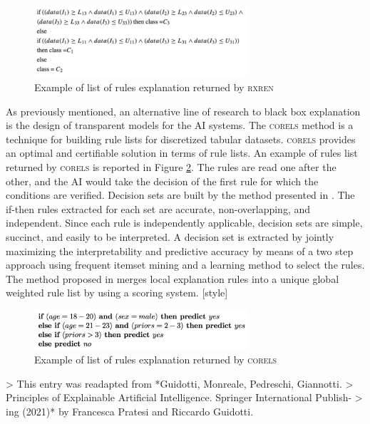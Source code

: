 \begin{figure}[!htb]
    \centering
    \includegraphics[width=300px]{TAILOR_T31_rules1.png}
    \caption{Example of list of rules explanation returned by \textsc{rxren}}
    \label{fig:rules_rxren}
\end{figure}


As previously mentioned, an alternative line of research to black box explanation
is the design of transparent models for the AI systems. The \textsc{corels} method \cite{angelino5} is
a technique for building rule lists for discretized tabular datasets. \textsc{corels} provides
an optimal and certifiable solution in terms of rule lists. An example of rules list
returned by \textsc{corels} is reported in Figure \ref{fig:rules_corels}. The rules are read one after the other,
and the AI would take the decision of the first rule for which the conditions are
verified. Decision sets are built by the method presented in \cite{lakkaraju39}. The if-then rules
extracted for each set are accurate, non-overlapping, and independent. Since each
rule is independently applicable, decision sets are simple, succinct, and easily to be
interpreted. A decision set is extracted by jointly maximizing the interpretability and
predictive accuracy by means of a two step approach using frequent itemset mining
and a learning method to select the rules. The method proposed in \cite{setzu63} merges local
explanation rules into a unique global weighted rule list by using a scoring system. [style]

\begin{figure}[!htb]
    \centering
    \includegraphics[width=300px]{TAILOR_T31_rules2.png}
    \caption{Example of list of rules explanation returned by \textsc{corels}}
    \label{fig:rules_corels}
\end{figure}





> This entry was readapted from *Guidotti, Monreale, Pedreschi, Giannotti.
> Principles of Explainable Artificial Intelligence. Springer International Publish-
> ing (2021)* by Francesca Pratesi and Riccardo Guidotti.
